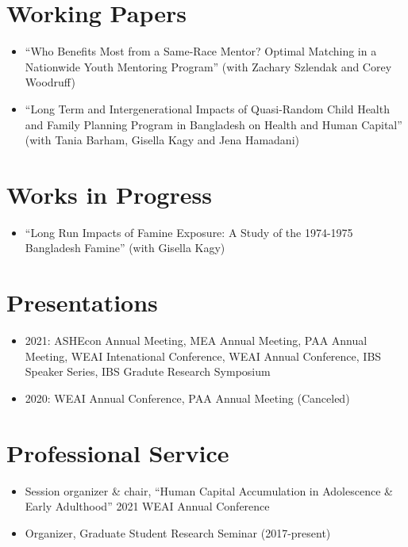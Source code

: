 \documentclass[letterpaper]{article}
\begin{document}
\section*{Working Papers}
\begin{itemize}
	\item ``Who Benefits Most from a Same-Race Mentor? Optimal Matching in a Nationwide Youth Mentoring Program'' (with Zachary Szlendak and Corey Woodruff)
	\item ``Long Term and Intergenerational Impacts of Quasi-Random Child Health and Family Planning Program in Bangladesh on Health and Human Capital'' (with Tania Barham, Gisella Kagy and Jena Hamadani)
\end{itemize}

\section*{Works in Progress}
\begin{itemize}
	\item ``Long Run Impacts of Famine Exposure: A Study of the 1974-1975 Bangladesh Famine'' (with Gisella Kagy)
\end{itemize}

\section*{Presentations}
\begin{itemize}
	\item[] 2021: ASHEcon Annual Meeting, MEA Annual Meeting, PAA Annual Meeting, WEAI Intenational Conference, WEAI Annual Conference, IBS Speaker Series, IBS Gradute Research Symposium
	\item[] 2020: WEAI Annual Conference, PAA Annual Meeting (Canceled)
\end{itemize}

\section*{Professional Service}
\begin{itemize}
	\item[] Session organizer \& chair, ``Human Capital Accumulation in Adolescence \& Early Adulthood'' 2021 WEAI Annual Conference 
	\item[] Organizer, Graduate Student Research Seminar (2017-present)
\end{itemize}
\end{document}
